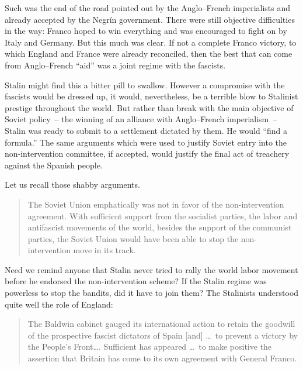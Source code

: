 Such was the end of the road pointed out by the Anglo--French imperialists and already accepted by the Negr\'in government. There were still objective difficulties in the way: Franco hoped to win everything and was encouraged to fight on by Italy and Germany. But this much was clear. If not a complete Franco victory, to which England and France were already reconciled, then the best that can come from Anglo--French ``aid'' was a joint regime with the fascists.


Stalin might find this a bitter pill to swallow. However a compromise with the fascists would be dressed up, it would, nevertheless, be a terrible blow to Stalinist prestige throughout the world. But rather than break with the main objective of Soviet policy~-- the winning of an alliance with Anglo--French imperialism~-- Stalin was ready to submit to a settlement dictated by them. He would ``find a formula.\kn\kn'' The same arguments which were used to justify Soviet entry into the non-intervention committee, if accepted, would justify the final act of treachery against the Spanish people.

\medskip

Let us recall those shabby arguments.

\begin{quotation}
  The Soviet Union emphatically was not in favor of the non-intervention agreement. With sufficient support from the socialist parties, the labor and antifascist movements of the world, besides the support of the communist parties, the Soviet Union would have been able to stop the non-interven\-tion move in its track.\label{en:GannesUSSR}
\end{quotation}

Need we remind anyone that Stalin never tried to rally the world labor movement before he endorsed the non-intervention scheme? If the Stalin regime was powerless to stop the bandits, did it have to join them? The Stalinists understood quite well the role of England: 

\begin{quotation}
  The Baldwin cabinet gauged its international action to retain the goodwill of the prospective fascist dictators of Spain [and] \dots\ to prevent a victory by the People’s Front\dots. Sufficient has appeared \dots\ to make positive the assertion that Britain has come to its own agreement with General Franco.\kn\endnotemark[\ref{en:GannesUSSR}]
\end{quotation}


